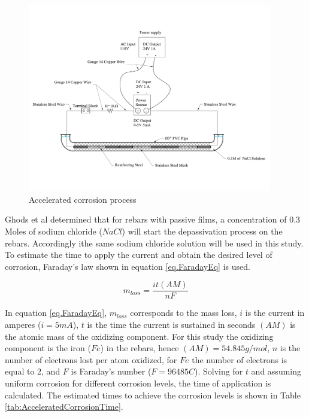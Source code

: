 \begin{figure}[htbp]
	\centering
	\includegraphics[width=0.95\textwidth]{Chapter-3/figs/AcceleratedCorrosionProcedure}
	\caption{Accelerated corrosion process}
	\label{fig:AcceleratedCorrosion}
\end{figure}

Ghods et al \cite{Ghods2010} determined that for rebars with passive films, a concentration of 0.3 Moles of sodium chloride ($NaCl$) will start the depassivation process on the rebars. Accordingly ithe same sodium chloride solution will be used in this study. To estimate the time to apply the current and obtain the desired level of corrosion,  Faraday's law shown in equation \ref{eq.FaradayEq} is used.

\begin{equation}
	m_{loss}=\frac{it(AM)}{nF}
	\label{eq.FaradayEq}
\end{equation}

 In equation \ref{eq.FaradayEq}, $m_{loss}$ corresponds to the mass loss, $i$ is the current in amperes ($i=5 mA$), $t$ is the time the current is sustained in seconds $(AM)$ is the atomic mass of the oxidizing component. For this study the oxidizing component is the iron ($Fe$) in the rebars, hence $(AM)=54.845g/mol$, $n$ is the number of electrons lost per atom oxidized, for $Fe$ the number of electrons is equal to 2, and $F$ is Faraday's number ($F=96485 C$). Solving  for $t$ and assuming uniform corrosion for different corrosion levels, the time of application is calculated. The estimated times to achieve the corrosion levels is shown in Table \ref{tab:AcceleratedCorrosionTime}. 

